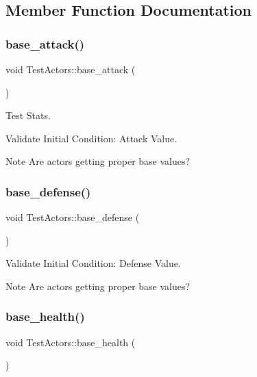 \subsection{Member Function Documentation}
\mbox{\label{classTestActors_a066d2adf19928b138d68d84401986dda}} 
\subsubsection{\texorpdfstring{base\+\_\+attack()}{base\_attack()}}
{\footnotesize\ttfamily void Test\+Actors\+::base\+\_\+attack (\begin{DoxyParamCaption}{ }\end{DoxyParamCaption})}



Test Stats. 

Validate Initial Condition\+: Attack Value.

\begin{DoxyNote}{Note}
Are actors getting proper base values? 
\end{DoxyNote}
\mbox{\label{classTestActors_aa3f64287c815f5d919e15a6434bba7de}} 
\subsubsection{\texorpdfstring{base\+\_\+defense()}{base\_defense()}}
{\footnotesize\ttfamily void Test\+Actors\+::base\+\_\+defense (\begin{DoxyParamCaption}{ }\end{DoxyParamCaption})}



Validate Initial Condition\+: Defense Value. 

\begin{DoxyNote}{Note}
Are actors getting proper base values? 
\end{DoxyNote}
\mbox{\label{classTestActors_a07a000bd17d45007304a026a5f33780d}} 
\subsubsection{\texorpdfstring{base\+\_\+health()}{base\_health()}}
{\footnotesize\ttfamily void Test\+Actors\+::base\+\_\+health (\begin{DoxyParamCaption}{ }\end{DoxyParamCaption})}



